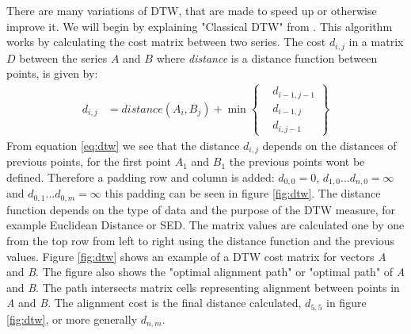 There are many variations of DTW, that are made to speed up or otherwise improve it. We will begin by explaining "Classical DTW" from \textcite{muller2007dynamic}. This algorithm works by calculating the cost matrix between two series. The cost $d_{i,j}$ in a matrix $D$ between the series $A$ and $B$ where \textit{distance} is a distance function between points, is given by:
\begin{equation}
    \label{eq:dtw}
    \begin{aligned}
        d_{i, j} & = distance(A_{i}, B_{j}) + \min \left\{ \begin{aligned}
                                                                & d_{i-1, j-1} \\
                                                                & d_{i-1, j}   \\
                                                                & d_{i, j-1}
                                                           \end{aligned} \right\}
    \end{aligned}
\end{equation}
From equation \ref{eq:dtw} we see that the distance $d_{i, j}$ depends on the distances of previous points, for the first point $A_{1}$ and $B_{1}$ the previous points wont be defined. Therefore a padding row and column is added: $d_{0,0} = 0$, $d_{1, 0}...d_{n, 0} = \infty$ and $d_{0, 1}...d_{0, m} = \infty$ this padding can be seen in figure \ref{fig:dtw}. The distance function depends on the type of data and the purpose of the DTW measure, for example Euclidean Distance or SED. The matrix values are calculated one by one from the top row from left to right using the distance function and the previous values. Figure \ref{fig:dtw} shows an example of a DTW cost matrix for vectors \textit{A} and \textit{B}. The figure also shows the "optimal alignment path" or "optimal path" of \textit{A} and \textit{B}. The path intersects matrix cells representing alignment between points in \textit{A} and \textit{B}. The alignment cost is the final distance calculated, $d_{5,5}$ in figure \ref{fig:dtw}, or more generally $d_{n,m}$.

